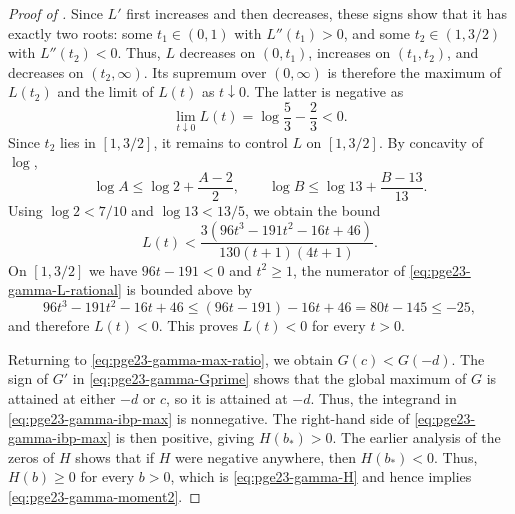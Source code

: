 \documentclass[11pt]{article}
\theoremstyle{remark}
\numberwithin{equation}{section}
\begin{document}
\begin{proof}[Proof of ]
  Since $L'$ first increases and then decreases, these signs show that it
  has exactly two roots: some $t_1\in(0,1)$ with $L''(t_1)>0$, and some
  $t_2\in(1,3/2)$ with $L''(t_2)<0$.
  Thus, $L$ decreases on $(0,t_1)$, increases on $(t_1,t_2)$, and
  decreases on $(t_2,\infty)$. Its supremum over $(0,\infty)$ is therefore
  the maximum of $L(t_2)$ and the limit of $L(t)$ as $t\downarrow0$.
  The latter is negative as
  \[
    \lim_{t\downarrow0}L(t)=\log\frac{5}{3}-\frac{2}{3}<0.
  \]
  Since $t_2$ lies in $[1,3/2]$, it remains to control $L$ on $[1,3/2]$.
  By concavity of $\log$,
  \[
    \log A\le\log2+\frac{A-2}{2},
    \qquad
    \log B\le\log13+\frac{B-13}{13}.
  \]
  Using $\log2<7/10$ and $\log13<13/5$, we obtain the bound
  \begin{equation}\label{eq:pge23-gamma-L-rational}
    L(t)<
    \frac{3(96t^3-191t^2-16t+46)}
    {130(t+1)(4t+1)}.
  \end{equation}
  On $[1,3/2]$ we have $96t-191<0$ and $t^2\ge1$, the numerator of \eqref{eq:pge23-gamma-L-rational} is bounded above by
  \begin{equation*}
  96t^3-191t^2-16t+46 \leq (96t-191)-16t+46=80t-145\le-25,
  \end{equation*}
 and therefore $L(t)<0$.
  This proves
  $L(t)<0$ for every $t>0$.

  Returning to \eqref{eq:pge23-gamma-max-ratio}, we obtain
  $G(c)<G(-d)$. The sign of $G'$ in \eqref{eq:pge23-gamma-Gprime}
  shows that the global maximum of $G$ is attained at either $-d$ or $c$,
  so it is attained at $-d$. Thus, the integrand in
  \eqref{eq:pge23-gamma-ibp-max} is nonnegative.
  The right-hand side of \eqref{eq:pge23-gamma-ibp-max} is then positive,
  giving $H(b_*)>0$. The earlier analysis of the zeros of $H$ shows that
  if $H$ were negative anywhere, then $H(b_*)<0$. Thus, $H(b)\ge0$ for
  every $b>0$, which is \eqref{eq:pge23-gamma-H} and hence implies
  \eqref{eq:pge23-gamma-moment2}.
\end{proof}
\end{document}
